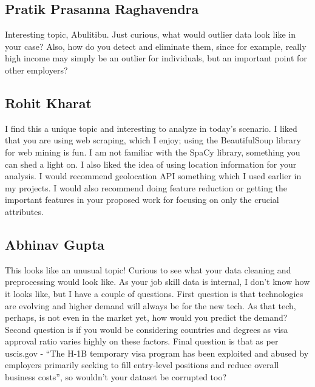 \subsection*{Pratik Prasanna Raghavendra}
Interesting topic, Abulitibu. Just curious, what would outlier data look like in your case? Also, how do you detect and eliminate them, since for example, really high income may simply be an outlier for individuals, but an important point for other employers?\\

\subsection*{Rohit Kharat}
I find this a unique topic and interesting to analyze in today's scenario. I liked that you are using web scraping, which I enjoy; using the BeautifulSoup library for web mining is fun. I am not familiar with the SpaCy library, something you can shed a light on. I also liked the idea of using location information for your analysis. I would recommend geolocation API something which I used earlier in my projects. I would also recommend doing feature reduction or getting the important features in your proposed work for focusing on only the crucial attributes. 

\subsection*{Abhinav Gupta}
This looks like an unusual topic! Curious to see what your data cleaning and preprocessing would look like.
As your job skill data is internal, I don't know how it looks like, but I have a couple of questions. First question is that technologies are evolving and higher demand will always be for the new tech. As that tech, perhaps, is not even in the market yet, how would you predict the demand? Second question is if you would be considering countries and degrees as visa approval ratio varies highly on these factors. Final question is that as per uscis.gov - “The H-1B temporary visa program has been exploited and abused by employers primarily seeking to fill entry-level positions and reduce overall business costs”, so wouldn't your dataset be corrupted too?

